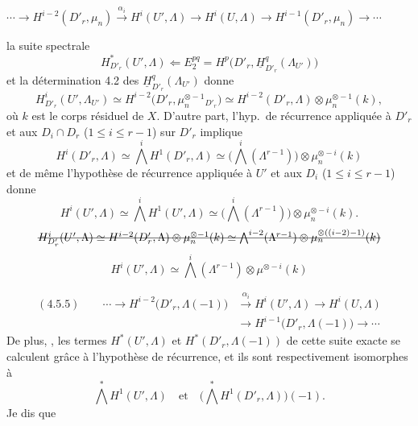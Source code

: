 \documentclass[11pt,a4paper]{article}
\begin{document}

 \quad $\cdots \to H^{i-2}(D'_r, \mu_n) \xrightarrow{\alpha_i} H^i(U', \Lambda) \to H^i(U, \Lambda) \to H^{i-1}(D'_r, \mu_n) \to \cdots$

 

 la suite spectrale
\[
H^*_{D'_r}(U', \Lambda) \Longleftarrow E_2^{pq} = H^p\bigl(D'_r, \underline{H}^q_{D'_r}(\Lambda_{U'})\bigr)
\]
et la détermination 4.2 des $\underline{H}^q_{D'_r}(\Lambda_{U'})$ donne
\[
H^i_{D'_r}(U', \Lambda_{U'}) \simeq H^{i-2}\bigl(D'_r, \mu_n^{\otimes -1}{}_{D'_r}\bigr) \simeq H^{i-2}(D'_r, \Lambda) \otimes \mu_n^{\otimes -1}(k) ,
\]
où $k$ est le corps résiduel de $X$.  D'autre part, l'hyp.\ de récurrence appliquée à $D'_r$ et aux $D_i \cap D_r$ ($1 \leq i \leq r-1$) sur $D'_r$ implique
\[
H^i(D'_r, \Lambda) \simeq \textstyle\bigwedge^i H^1(D'_r, \Lambda) \simeq \bigl(\bigwedge^i(\Lambda^{r-1})\bigr) \otimes \mu_n^{\otimes -i}(k)
\]
et de même l'hypothèse de récurrence appliquée à $U'$ et aux $D_i$ ($1 \leq i \leq r-1$) donne
\[
H^i(U', \Lambda) \simeq \textstyle\bigwedge^i H^1(U', \Lambda) \simeq \bigl(\bigwedge^i(\Lambda^{r-1})\bigr) \otimes \mu_n^{\otimes -i}(k) .
\]
\[
\text{\struck{$H^i_{D'_r}(U', \Lambda) \simeq H^{i-2}(D'_r, \Lambda) \otimes \mu_n^{\otimes -1}(k) \simeq \bigwedge^{i-2}(\Lambda^{r-1}) \otimes \mu_n^{\otimes((i-2)-1)}(k)$}}
\]
\[
H^i(U', \Lambda) \simeq \textstyle\bigwedge^i(\Lambda^{r-1}) \otimes \mu^{\otimes -i}(k)
\]


\[
\begin{aligned}
(4.5.5) \qquad \cdots \to H^{i-2}\bigl(D'_r, \Lambda(-1)\bigr) &\xrightarrow{\alpha_i} H^i(U', \Lambda) \to H^i(U, \Lambda) \\
&\to H^{i-1}\bigl(D'_r, \Lambda(-1)\bigr) \to \cdots
\end{aligned}
\]
De plus, , les termes $H^*(U', \Lambda)$ et $H^*(D'_r, \Lambda(-1))$ de cette suite exacte se calculent grâce à l'hypothèse de récurrence, et ils sont respectivement isomorphes à
\[
\textstyle\bigwedge^* H^1(U', \Lambda) \quad \text{et} \quad \bigl(\bigwedge^* H^1(D'_r, \Lambda)\bigr)(-1) .
\]
Je dis que
\end{document}
